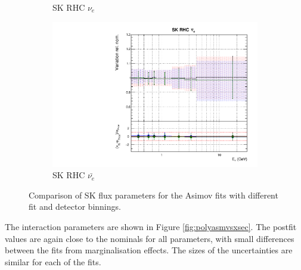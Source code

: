 \begin{figure}[!htbp]
\begin{subfigure}{0.45\textwidth}
  \caption{SK RHC $\nu_{e}$}
\end{subfigure}
\begin{subfigure}{0.45\textwidth}
  \centering
  \includegraphics[width=0.75\linewidth]{figs/polyasmvsflux_15}
  \caption{SK RHC $\bar{\nu_e}$}
\end{subfigure}
\caption{Comparison of SK flux parameters for the Asimov fits with different fit and detector binnings.}
\label{fig:polyasmvsfluxSK}
\end{figure}

The interaction parameters are shown in Figure \ref{fig:polyasmvsxsec}. The postfit values are again close to the nominals for all parameters, with small differences between the fits from marginalisation effects. The sizes of the uncertainties are similar for each of the fits.

